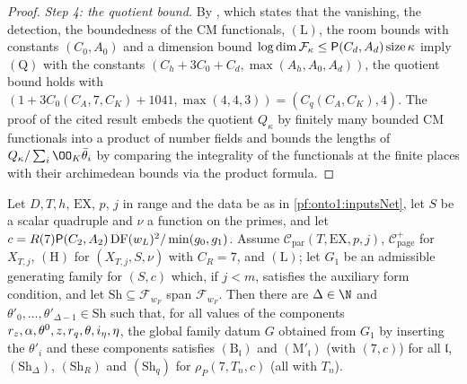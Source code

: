 \begin{proof}
\emph{Step 4: the quotient bound.} By , which states that
the vanishing, the detection, the boundedness of the CM functionals, $(\mathrm L)$, the room bounds with constants
$(C_0,A_0)$ and a dimension bound $\log\dim\mathcal F_\kappa\le\mathsf{P}(C_d,A_d)\operatorname{size}\kappa$ imply $(\mathrm Q)$ with the constants
$(C_h+3C_0+C_d,\max(A_h,A_0,A_d))$, the quotient bound holds with $(1+3C_0(C_A,7,C_K)+1041,\max(4,4,3))=(C_q(C_A,C_K),4)$. The
proof of the cited result embeds the quotient $Q_\kappa$ by finitely many bounded CM functionals into a product of number
fields and bounds the lengths of $Q_\kappa/\sum_i\OO_K\bar\theta_i$ by comparing the integrality of the functionals at the
finite places with their archimedean bounds via the product formula.
\end{proof}

\begin{theorem}\label{pf:onto1:shares}
Let $D,T,h$, $\mathrm{EX}$, $p$, $j$ in range and the data be as in \cref{pf:onto1:inputsNet}, let $S$ be a scalar quadruple and
$\nu$ a function on the primes, and let $c=R(7)\mathsf{P}(C_2,A_2)\operatorname{DF}(w_L)^2/\min(g_0,g_1)$. Assume
$\mathcal C_{\mathrm{par}}(T,\mathrm{EX},p,j)$, $\mathcal C^+_{\mathrm{page}}$ for $X_{T,j}$, $(\mathrm H)$ for $(X_{T,j},S,\nu)$ with $C_R=7$, and
$(\mathrm L)$; let $G_1$ be an admissible generating family for $(S,c)$ which, if $j<m$, satisfies the auxiliary form
condition, and let $\mathrm{Sh}\subseteq\mathcal F_{w_F}$ span $\mathcal F_{w_F}$. Then there are $\Delta\in\N$ and
$\theta'_0,\dots,\theta'_{\Delta-1}\in\mathrm{Sh}$ such that, for all values of the components $r_z,\alpha,\theta^0,z,r_q,\theta,i_\eta,\eta$,
the global family datum $G$ obtained from $G_1$ by inserting the $\theta'_i$ and these components satisfies $(\mathrm B_{\mathfrak l})$
and $(\mathrm M'_{\mathfrak l})$ (with $(7,c)$) for all $\mathfrak l$, $(\mathrm{Sh}_\Delta)$, $(\mathrm{Sh}_R)$ and $(\mathrm{Sh}_q)$ for
$\rho_P(7,T_n,c)$ (all with $T_n$).
\end{theorem}

